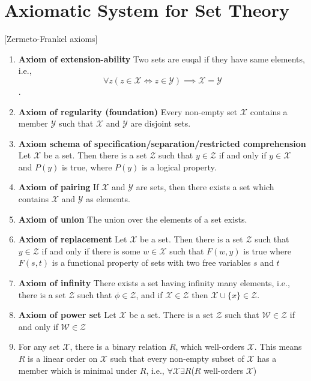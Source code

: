 \documentclass[a4paper,10pt]{article}
\begin{document}
\section{Axiomatic System for Set Theory}[Zermeto-Frankel axioms]
\begin{enumerate}
 \item \textbf{Axiom of extension-ability} Two sets are euqal if they have same elements, i.e.,
 $$\forall z (z\in \mathcal{X} \Leftrightarrow z\in \mathcal{Y})\implies \mathcal{X}=\mathcal{Y}$$.
 \item \textbf{Axiom of regularity (foundation)} Every non-empty set $\mathcal{X}$ contains a member $\mathcal{Y}$ such that
 $\mathcal{X}$ and $\mathcal{Y}$ are disjoint sets. 
 \item \textbf{Axiom schema of specification/separation/restricted comprehension} Let $\mathcal{X}$ be a set. Then
there is a set $\mathcal{Z}$ such that $y \in\mathcal{Z}$ if and only if $y \in \mathcal{X}$ and $P(y)$ is true, where $P(y)$ is a logical property. 
 \item \textbf{Axiom of pairing} If $\mathcal{X}$ and $\mathcal{Y}$ are sets, then there exists a set which contains $\mathcal{X}$ and $\mathcal{Y}$ as elements. 
 \item \textbf{Axiom of union} The union over the elements of a set exists. 
 \item \textbf{Axiom of replacement} Let $\mathcal{X}$ be a set. Then there is a set $\mathcal{Z}$ such that $y\in \mathcal{Z}$ if and only if there is some $w \in \mathcal{X}$ such that $F(w, y)$ is true where $F(s, t)$ is a functional property of sets with two free variables $s$ and $t$ 
 \item \textbf{Axiom of infinity} There exists a set having infinity many elements, i.e., there is a set $\mathcal{Z}$ such that $\phi  \in \mathcal{Z}$, and if $\mathcal{X} ∈ \mathcal{Z}$ then $\mathcal{X} ∪ \{x\} ∈ \mathcal{Z}$.
\item \textbf{Axiom of power set} Let $\mathcal{X}$ be a set. There is a set $\mathcal{Z}$ such that $\mathcal{W}\in\mathcal{Z}$ if and only if $\mathcal{W}\in \mathcal{Z}$
\item For any set $\mathcal{X}$, there is a binary relation $R$, which well-orders $\mathcal{X}$. This means $R$ is a linear order on $\mathcal{X}$ such that every non-empty subset of $\mathcal{X}$ has a member which is minimal under $R$, i.e., $\forall \mathcal{X}\exists R $($R$ well-orders $\mathcal{X}$)
 \end{enumerate}
\end{document}
